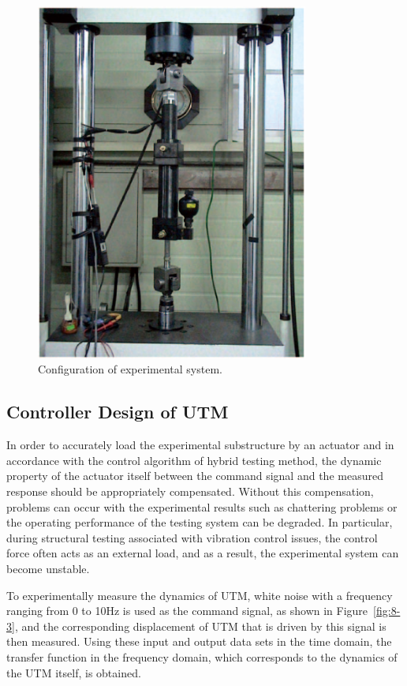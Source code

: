 \begin{figure}[!ht]
\centering
\includegraphics[width=0.8\textwidth] {figure/8-2.eps}
\caption{Configuration of experimental system.}
\label{fig:8-2}
\end{figure}


\subsection{Controller Design of UTM}
In order to accurately load the experimental substructure by an actuator and in accordance with the control algorithm of hybrid testing method, the dynamic property of the actuator itself between the command signal and the measured response should be appropriately compensated. Without this compensation, problems can occur with the experimental results such as chattering problems or the operating performance of the testing system can be degraded. In particular, during structural testing associated with vibration control issues, the control force often acts as an external load, and as a result, the experimental system can become unstable.

To experimentally measure the dynamics of UTM, white noise with a frequency ranging from 0 to 10Hz is used as the command signal, as shown in Figure~\ref{fig:8-3}, and the corresponding displacement of UTM that is driven by this signal is then measured. Using these input and output data sets in the time domain, the transfer function in the frequency domain, which corresponds to the dynamics of the UTM itself, is obtained.

